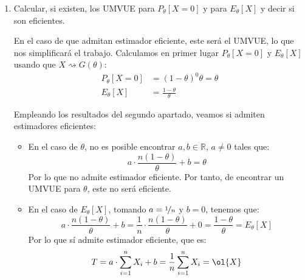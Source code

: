 \begin{ejercicio}
\begin{enumerate}
            Si calculamos ahora la varianza de $T=a\cdot \sum\limits_{i=1}^n X_i$ y la cota de Fréchet-Cramér-Rao:
            \begin{align*}
                Var[T] &= Var\left[a\cdot \sum_{i=1}^{n}X_i+b\right] \stackrel{\text{indep.}}{=} a^2\sum_{i=1}^{n}Var[X_i] = a^2\sum_{i=1}^{n} \left(\frac{1-\theta}{\theta^2}\right) \\ &= \frac{a^2n(1-\theta)}{\theta^2} \\
                \frac{{(ag'(\theta))}^{2}}{I_{(X_1,\ldots,X_n)}(\theta)} &= \frac{{\left(\frac{-an}{\theta^2}\right)}^{2}}{\frac{n}{\theta^2(1-\theta)}} = \frac{a^2n(1-\theta)}{\theta^2}
            \end{align*}
        \item Calcular, si existen, los UMVUE para $P_\theta[X=0]$ y para $E_\theta[X]$ y decir si son eficientes.
        
            En el caso de que admitan estimador eficiente, este será el UMVUE, lo que nos simplificará el trabajo. Calculamos en primer lugar $P_\theta[X=0]$ y $E_\theta[X]$ usando que $X\rightsquigarrow G(\theta)$:
            \begin{align*}
                P_\theta[X=0] &= {(1-\theta)}^{0}\theta = \theta \\
                E_\theta[X] &= \frac{1-\theta}{\theta}
            \end{align*}

            Empleando los resultados del segundo apartado, veamos si admiten estimadores eficientes:
            \begin{itemize}
                \item En el caso de $\theta$, no es posible encontrar $a,b\in \mathbb{R}$, $a\neq 0$ tales que:
                    \begin{equation*}
                        a\cdot \frac{n(1-\theta)}{\theta} + b = \theta
                    \end{equation*}
                    Por lo que no admite estimador eficiente. Por tanto, de encontrar un UMVUE para $\theta$, este no será eficiente.
                \item En el caso de $E_\theta[X]$, tomando $a=\nicefrac{1}{n}$ y $b=0$, tenemos que:
                    \begin{equation*}
                        a\cdot \frac{n(1-\theta)}{\theta} + b = \frac{1}{n}\cdot \frac{n(1-\theta)}{\theta} + 0 = \frac{1-\theta}{\theta} = E_\theta[X]
                    \end{equation*}
                    Por lo que sí admite estimador eficiente, que es:
                    \begin{equation*}
                        T = a\cdot \sum_{i=1}^{n}X_i + b = \frac{1}{n}\sum_{i=1}^{n}X_i = \ol{X}
                    \end{equation*}


\end{itemize}
\end{enumerate}
\end{ejercicio}
